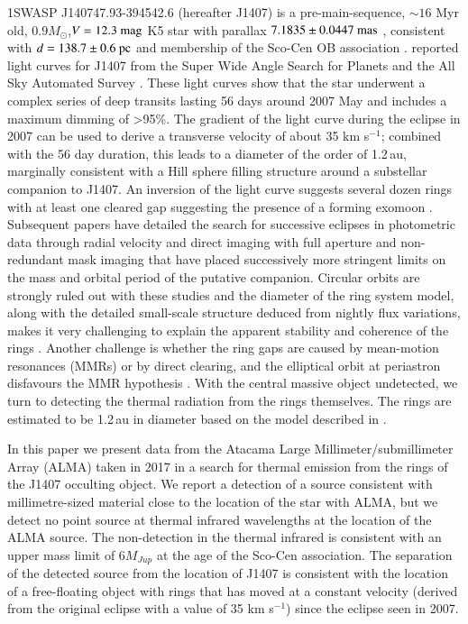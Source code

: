 \documentclass{aa} %
\newcommand{\kms}{km s$^{-1}$}
\begin{document}
1SWASP J140747.93-394542.6 (hereafter J1407) is a pre-main-sequence, $\sim 16$ Myr old, $0.9M_\odot$,$V=12.3{\rm~mag}$ K5 star with parallax $7.1835\pm 0.0447{\rm~mas}$ \citep{Gaia18}, consistent with  $d=138.7\pm 0.6{\rm~pc}$ \citep{Bailer-Jones18} and membership of the Sco-Cen OB association \citep{Mamajek12}.
%
\citet{Mamajek12} reported  light curves for J1407 from the Super Wide Angle Search for Planets \citep[SuperWASP;][]{Butters10} and the All Sky Automated Survey \citep[ASAS;][]{Pojmanski02}.
%
These light curves show that the star underwent a complex series of deep transits lasting 56 days around 2007 May and includes a maximum dimming of >95\%.
%
The gradient of the light curve during the eclipse in 2007 can be used to derive a transverse velocity of about 35 \kms{}; combined with the 56 day duration, this leads to a diameter of the order of 1.2\,au, marginally consistent with a Hill sphere filling structure around a substellar companion to J1407.
%
An inversion of the light curve suggests several dozen rings with at least one cleared gap suggesting the presence of a forming exomoon \citep{Mamajek12,vanWerkhoven14,Kenworthy15b}.
%
Subsequent papers have detailed the search for successive eclipses in photometric data \citep{Kenworthy15b,Mentel18} through radial velocity and direct imaging with full aperture and non-redundant mask imaging \citep{Kenworthy15} that have placed successively more  stringent limits on the mass and orbital period of the putative companion.
%
Circular orbits are strongly ruled out with these studies and the diameter of the ring system model, along with the detailed small-scale structure deduced from nightly flux variations, makes it very challenging to explain the apparent stability and coherence of the rings \citep{Zanazzi17,Rieder16}.
%
Another challenge is whether the ring gaps are caused by mean-motion resonances (MMRs) or by direct clearing, and the elliptical orbit at periastron disfavours the MMR hypothesis \citep{Sutton19}.
%
With the central massive object undetected, we turn to detecting the thermal radiation from the rings themselves.
%
The rings are estimated to be 1.2\,au in diameter based on the model described in \citet{Kenworthy15b}.

In this paper we present data from the Atacama Large Millimeter/submillimeter Array (ALMA) taken in 2017 in a search for thermal emission from the rings of the J1407 occulting object.
%
We report a detection of a source consistent with millimetre-sized material close to the location of the star with ALMA, but we detect no point source at thermal infrared wavelengths at the location of the ALMA source.
%
The non-detection in the thermal infrared is consistent with an upper mass limit of $6M_{Jup}$ at the age of the Sco-Cen association.
%
The separation of the detected source from the location of J1407 is consistent with the location of a free-floating object with rings that has moved at a constant velocity (derived from the original eclipse with a value of 35 \kms{}) since the eclipse seen in 2007.
\end{document}
